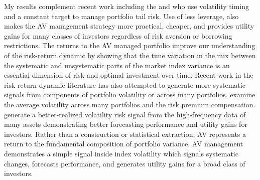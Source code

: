 My results complement recent work including the \citet{moreira_volatility-managed_2017} and \citet{hocquard_constant-volatility_2013} who use volatility timing and a constant target to manage portfolio tail risk. Use of less leverage, also makes the AV management strategy more practical, cheaper, and provides utility gains for many classes of investors regardless of risk aversion or borrowing restrictions. The returns to the AV managed portfolio improve our understanding of the risk-return dynamic by showing that the time variation in the mix between the systematic and unsystematic parts of the market index variance is an essential dimension of risk and optimal investment over time.  Recent work in the risk-return dynamic literature has also attempted to generate more systematic signals from components of portfolio volatility or across many portfolios. \citet{gonzalez-urteaga_cross-sectional_2016} examine the average volatility across many portfolios and the risk premium compensation. \citet{bollerslev_risk_2017} generate a better-realized volatility risk signal from the high-frequency data of many assets demonstrating better forecasting performance and utility gains for investors. Rather than a construction or statistical extraction, AV represents a return to the fundamental composition of portfolio variance. AV management demonstrates a simple signal inside index volatility which signals systematic changes, forecasts performance, and generates utility gains for a broad class of investors.